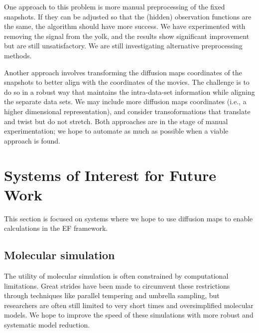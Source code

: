 \documentclass[12pt]{article}
\begin{document}
One approach to this problem is more manual preprocessing of the fixed snapshots. If they can be adjusted so that the (hidden) observation functions are the same, the algorithm should have more success. We have experimented with removing the signal from the yolk, and the results show significant improvement but are still unsatisfactory. We are still investigating alternative preprocessing methods. \vspace{1mm}

Another approach involves transforming the diffusion maps coordinates of the snapshots to better align with the coordinates of the movies. The challenge is to do so in a robust way that maintains the intra-data-set information while aligning the separate data sets. We may include more diffusion maps coordinates (i.e., a higher dimensional representation), and consider transoformations that translate and twist but do not stretch. Both approaches are in the stage of manual experimentation; we hope to automate as much as possible when a viable approach is found. \vspace{1mm}

\section{Systems of Interest for Future Work}

This section is focused on systems where we hope to use diffusion maps to enable calculations in the EF framework.

\subsection{Molecular simulation}

The utility of molecular simulation is often constrained by computational limitations. Great strides have been made to circumvent these restrictions through techniques like parallel tempering and umbrella sampling, but researchers are often still limited to very short times and oversimplified molecular models. We hope to improve the speed of these simulations with more robust and systematic model reduction. \vspace{1mm}
\end{document}

